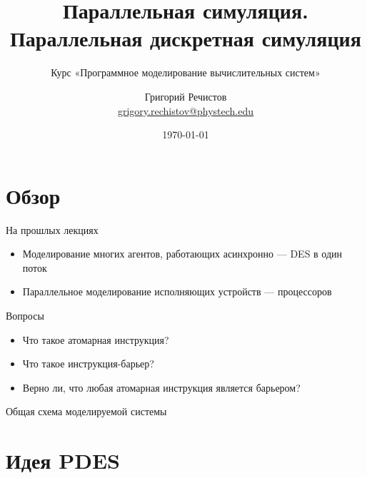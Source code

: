 \documentclass{beamer}
\title{Параллельная симуляция. Параллельная дискретная симуляция}
\subtitle{Курс «Программное моделирование вычислительных систем»}
\author[]{Григорий Речистов \\ \small{\href{mailto:grigory.rechistov@phystech.edu}{grigory.rechistov@phystech.edu}}}
\date{\today}
\begin{document}
\begin{frame}
\titlepage
\end{frame}

\begin{frame}
\tableofcontents
\end{frame} 

\section{Обзор}

\begin{frame}{На прошлых лекциях}
\begin{itemize}
\item Моделирование многих агентов, работающих асинхронно — DES в один поток
\item Параллельное моделирование исполняющих устройств — процессоров
\end{itemize}

\end{frame}

\begin{frame}{Вопросы}
\begin{itemize}
\item Что такое атомарная инструкция?\pause
\item Что такое инструкция-барьер?\pause
\item Верно ли, что любая атомарная инструкция является барьером?
\end{itemize}

\end{frame}


\begin{frame}{Общая схема моделируемой системы}

\centering
{}

\end{frame}

\section{Идея PDES}
\end{document}
